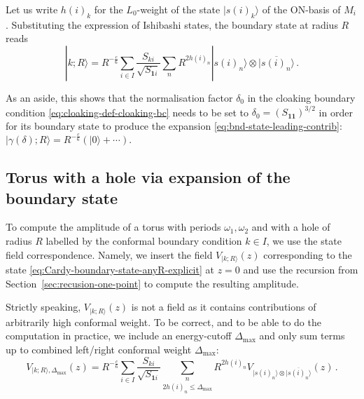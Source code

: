 \documentclass[11pt,a4paper]{article}
\numberwithin{equation}{section}
\def\ket#1{|{#1}\rangle}
\newcommand{\one}{\mathbf{1}} %
\begin{document}
Let us write $h(i)_k$ for the $L_0$-weight of the state $\ket{s(i)_k}$ of the ON-basis of $M_i$. Substituting the expression of Ishibashi states, the boundary state at radius $R$ reads
%
\begin{equation}\label{eq:Cardy-boundary-state-anyR-explicit}
\ket{k;R} = R^{- \frac c6} \sum_{i \in I}
 \frac{S_{ki}}{\sqrt{S_{\one i}}}
 \sum_{n} 
R^{2h(i)_{n}}  \ket{s(i)_{n}} \otimes \overline{\ket{s(i)_{n}}}
  \,.
\end{equation}


\noindent
As an aside, this shows that the normalisation factor $\delta_0$ in the cloaking boundary condition \eqref{eq:cloaking-def-cloaking-bc} needs to be set to $\delta_0 = (S_{\one\one})^{3/2}$ in order for its boundary state to produce the expansion \eqref{eq:bnd-state-leading-contrib}: 
$\ket{\gamma(\delta);R} = R^{- \frac c6} ( |0\rangle + \cdots )$.


\subsection{Torus with a hole via expansion of the boundary state}\label{sec:TorusBoundaryExpansion}

To compute the amplitude of a torus with periods $\omega_1,\omega_2$ and with a hole of radius $R$ labelled by the conformal boundary condition $k \in I$, we use the state field correspondence. Namely, we insert the field $V_{\ket{k;R}}(z)$ corresponding to the state \eqref{eq:Cardy-boundary-state-anyR-explicit} at $z=0$ and use the recursion from Section~\ref{sec:recusion-one-point} to compute the resulting amplitude. 

Strictly speaking, $V_{\ket{k;R}}(z)$ is not a field as it contains contributions of arbitrarily high conformal weight.
To be correct, and to be able to do the computation in practice, we include an energy-cutoff $\Delta_\mathrm{max}$ and only sum terms up to combined left/right conformal weight $\Delta_\mathrm{max}$:
\begin{equation}\label{eq:Cardy-boundary-state-V-anyR-explicit}
V_{\ket{k;R},\Delta_\mathrm{max}}(z)
 = R^{- \frac c6} \sum_{i \in I}
\frac{S_{ki}}{\sqrt{S_{\one i}}}
\underset{2h(i)_{n} \le\Delta_\mathrm{max}}{\sum_{n}} 
R^{2h(i)_{n}}  V_{\ket{s(i)_{n}} \otimes \overline{\ket{s(i)_{n}}}}(z)
\,.
\end{equation}
\end{document}
